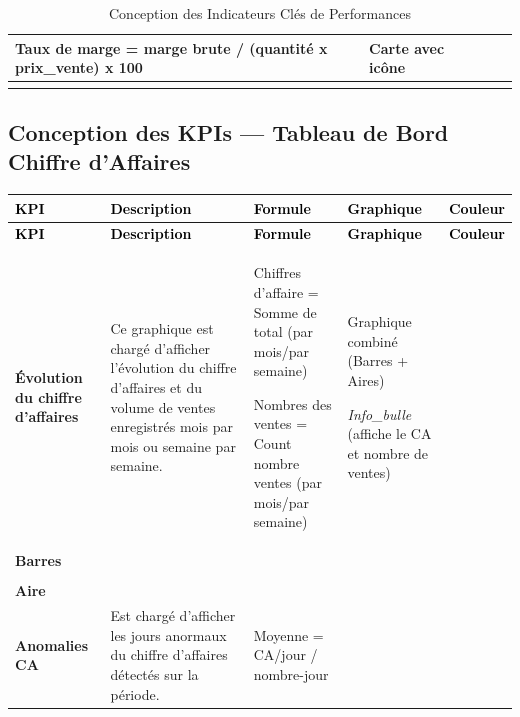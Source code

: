 \begin{longtable}{|>{\centering\arraybackslash\bfseries}p{2.5cm}|>{\raggedright\arraybackslash}p{4cm}|>{\raggedright\arraybackslash}p{4cm}|>{\centering\arraybackslash}p{1.8cm}|>{\centering\arraybackslash}p{1.5cm}|}
\vspace{4pt}
Taux de marge = marge brute / (quantité x prix\_vente) x 100 &
Carte avec icône &
{orange!80!black} \\
\hline
\caption{Conception des Indicateurs Clés de Performances}
\label{tab:kpi-generaux}
\end{longtable}

\newpage

\subsection*{Conception des KPIs — Tableau de Bord Chiffre d'Affaires}

\begin{longtable}{|>{\centering\arraybackslash\bfseries}p{2.5cm}|>{\raggedright\arraybackslash}p{3.5cm}|>{\raggedright\arraybackslash}p{4cm}|>{\centering\arraybackslash}p{1.8cm}|>{\centering\arraybackslash}p{1.5cm}|}
\hline
\rowcolor{blue!20}
\textcolor{black}{\textbf{KPI}} &
\textcolor{black}{\textbf{Description}} &
\textcolor{black}{\textbf{Formule}} &
\textcolor{black}{\textbf{Graphique}} &
\textcolor{black}{\textbf{Couleur}} \\
\hline
\endfirsthead
\hline
\rowcolor{blue!20}
\textcolor{black}{\textbf{KPI}} &
\textcolor{black}{\textbf{Description}} &
\textcolor{black}{\textbf{Formule}} &
\textcolor{black}{\textbf{Graphique}} &
\textcolor{black}{\textbf{Couleur}} \\
\hline
\endhead
Évolution du chiffre d'affaires &
Ce graphique est chargé d'afficher l'évolution du chiffre d'affaires et du volume de ventes enregistrés mois par mois ou semaine par semaine. &
Chiffres d'affaire = Somme de total (par mois/par semaine)

\vspace{4pt}
Nombres des ventes = Count nombre ventes (par mois/par semaine) &
Graphique combiné (Barres + Aires)

\vspace{4pt}
\textit{Info\_bulle} (affiche le CA et nombre de ventes) &
\begin{tabular}[c]{@{}c@{}}
{blue!70!black}\\[-2pt]
{\tiny Barres}\\[6pt]
{blue!30}\\[-2pt]
{\tiny Aire}
\end{tabular} \\
\hline
Anomalies CA &
Est chargé d'afficher les jours anormaux du chiffre d'affaires détectés sur la période. &
Moyenne = CA/jour / nombre-jour


\end{longtable}
